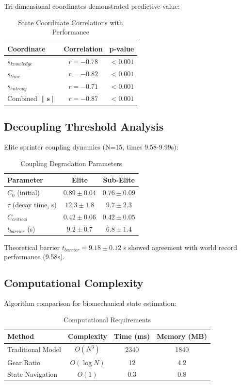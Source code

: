\documentclass[12pt,twocolumn]{article}
\begin{document}
Tri-dimensional coordinates demonstrated predictive value:

\begin{table}[H]
\centering
\caption{State Coordinate Correlations with Performance}
\begin{tabular}{lcc}
\toprule
Coordinate & Correlation & p-value \\
\midrule
$s_{knowledge}$ & $r = -0.78$ & $< 0.001$ \\
$s_{time}$ & $r = -0.82$ & $< 0.001$ \\
$s_{entropy}$ & $r = -0.71$ & $< 0.001$ \\
Combined $\|\mathbf{s}\|$ & $r = -0.87$ & $< 0.001$ \\
\bottomrule
\end{tabular}
\end{table}

\subsection{Decoupling Threshold Analysis}

Elite sprinter coupling dynamics (N=15, times 9.58-9.99s):

\begin{table}[H]
\centering
\caption{Coupling Degradation Parameters}
\begin{tabular}{lcc}
\toprule
Parameter & Elite & Sub-Elite \\
\midrule
$C_{0}$ (initial) & $0.89 \pm 0.04$ & $0.76 \pm 0.09$ \\
$\tau$ (decay time, s) & $12.3 \pm 1.8$ & $9.7 \pm 2.3$ \\
$C_{critical}$ & $0.42 \pm 0.06$ & $0.42 \pm 0.05$ \\
$t_{barrier}$ (s) & $9.2 \pm 0.7$ & $6.8 \pm 1.4$ \\
\bottomrule
\end{tabular}
\end{table}

Theoretical barrier $t_{barrier} = 9.18 \pm 0.12$ s showed agreement with world record performance (9.58s).

\subsection{Computational Complexity}

Algorithm comparison for biomechanical state estimation:

\begin{table}[H]
\centering
\caption{Computational Requirements}
\begin{tabular}{lccc}
\toprule
Method & Complexity & Time (ms) & Memory (MB) \\
\midrule
Traditional Model & $O(N^3)$ & 2340 & 1840 \\
Gear Ratio & $O(\log N)$ & 12 & 4.2 \\
State Navigation & $O(1)$ & 0.3 & 0.8 \\
\bottomrule
\end{tabular}
\end{table}
\end{document}

